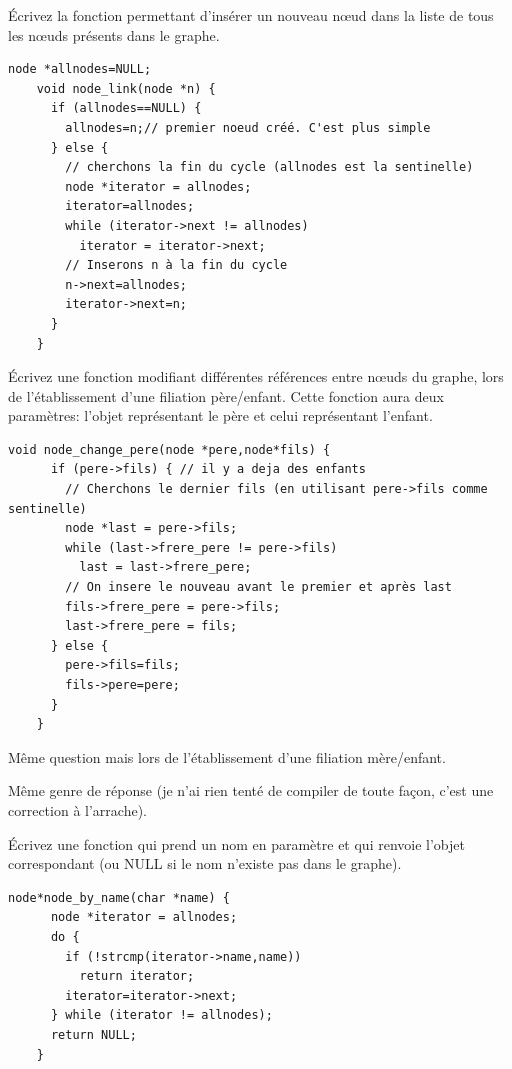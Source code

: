 \documentclass[10pt]{article}\usepackage[correction]{exemptty}
\begin{document}
\Question Écrivez la fonction permettant d'insérer un nouveau nœud dans la
liste de tous les nœuds présents dans le graphe.

\begin{Reponse}
  \begin{Verbatim}[gobble=4]
    node *allnodes=NULL;
    void node_link(node *n) {
      if (allnodes==NULL) {
        allnodes=n;// premier noeud créé. C'est plus simple
      } else {
        // cherchons la fin du cycle (allnodes est la sentinelle)
        node *iterator = allnodes;
        iterator=allnodes;
        while (iterator->next != allnodes)
          iterator = iterator->next;
        // Inserons n à la fin du cycle
        n->next=allnodes;
        iterator->next=n;
      }
    }
  \end{Verbatim}
\end{Reponse}


\Question Écrivez une fonction modifiant différentes références entre nœuds du
graphe, lors de l'établissement d'une filiation père/enfant. Cette fonction
aura deux paramètres: l'objet représentant le père et celui représentant
l'enfant.
\begin{Reponse}
  \begin{Verbatim}[gobble=4]
    void node_change_pere(node *pere,node*fils) {
      if (pere->fils) { // il y a deja des enfants
        // Cherchons le dernier fils (en utilisant pere->fils comme sentinelle)
        node *last = pere->fils;
        while (last->frere_pere != pere->fils)
          last = last->frere_pere;
        // On insere le nouveau avant le premier et après last
        fils->frere_pere = pere->fils;
        last->frere_pere = fils;
      } else {
        pere->fils=fils;
        fils->pere=pere;
      }
    }
  \end{Verbatim}
\end{Reponse}


\Question Même question mais lors de l'établissement d'une filiation
mère/enfant.

\begin{Reponse}
  Même genre de réponse (je n'ai rien tenté de compiler de toute façon, c'est
  une correction à l'arrache).
\end{Reponse}

\Question Écrivez une fonction qui prend un nom en paramètre et qui renvoie
l'objet correspondant (ou NULL si le nom n'existe pas dans le graphe).

\begin{Reponse}
  \begin{Verbatim}[gobble=4]
    node*node_by_name(char *name) {
      node *iterator = allnodes;
      do {
        if (!strcmp(iterator->name,name))
          return iterator;
        iterator=iterator->next;
      } while (iterator != allnodes);
      return NULL;
    }
  \end{Verbatim}
\end{Reponse}
\end{document}
